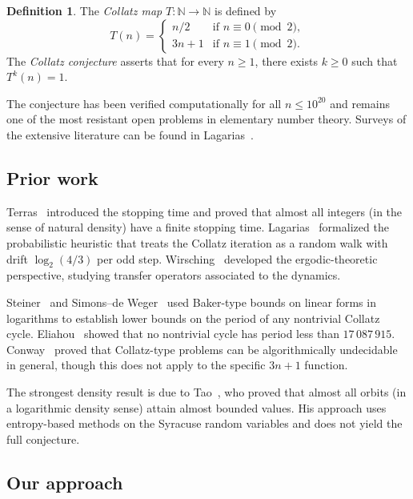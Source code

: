 \documentclass[manuscript]{aomart}
\newcommand{\N}{\mathbb{N}}
\theoremstyle{plain}
\theoremstyle{definition}
\newtheorem{definition}[theorem]{Definition}
\theoremstyle{remark}
\numberwithin{equation}{section}
\begin{document}
\begin{definition}\label{def:collatz}
The \emph{Collatz map} $T\colon \N \to \N$ is defined by
\[
  T(n) =
  \begin{cases}
    n/2 & \text{if } n \equiv 0 \pmod{2},\\
    3n+1 & \text{if } n \equiv 1 \pmod{2}.
  \end{cases}
\]
The \emph{Collatz conjecture} asserts that for every $n \ge 1$,
there exists $k \ge 0$ such that $T^k(n) = 1$.
\end{definition}

The conjecture has been verified computationally for all
$n \le 10^{20}$ \cite{Oliveira2015} and remains one of the most
resistant open problems in elementary number theory.  Surveys of the
extensive literature can be found in Lagarias~\cite{Lagarias1985,
Lagarias2010}.

\subsection{Prior work}

Terras~\cite{Terras1976} introduced the stopping time and proved that
almost all integers (in the sense of natural density) have a finite
stopping time.  Lagarias~\cite{Lagarias1985} formalized the
probabilistic heuristic that treats the Collatz iteration as a random
walk with drift $\log_2(4/3)$ per odd step.  Wirsching~\cite{Wirsching1998}
developed the ergodic-theoretic perspective, studying transfer
operators associated to the dynamics.

Steiner~\cite{Steiner1977} and Simons--de Weger~\cite{SimonsDeWeger2005}
used Baker-type bounds on linear forms in logarithms to establish
lower bounds on the period of any nontrivial Collatz cycle.
Eliahou~\cite{Eliahou1993} showed that no nontrivial cycle has period
less than $17\,087\,915$.  Conway~\cite{Conway1972} proved that
Collatz-type problems can be algorithmically undecidable in general,
though this does not apply to the specific $3n+1$ function.

The strongest density result is due to Tao~\cite{Tao2022}, who proved
that almost all orbits (in a logarithmic density sense) attain almost
bounded values.  His approach uses entropy-based methods on the
Syracuse random variables and does not yield the full conjecture.

\subsection{Our approach}
\end{document}
